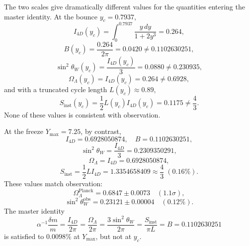 \documentclass[12pt,oneside,openany]{book}
\begin{document}
The two scales give dramatically different values for the quantities entering the master identity. At the bounce $y_c = 0.7937$,
\begin{equation}
I_{4D}(y_c) = \int_0^{0.7937} \frac{y\,dy}{1 + 2y^3} = 0.264,
\label{eq:I4D-yc}
\end{equation}
\begin{equation}
B(y_c) = \frac{0.264}{2\pi} = 0.0420 \neq 0.1102630251,
\label{eq:B-yc}
\end{equation}
\begin{equation}
\sin^2\theta_W(y_c) = \frac{I_{4D}(y_c)}{3} = 0.0880 \neq 0.230935,
\label{eq:sin2-yc}
\end{equation}
\begin{equation}
\Omega_\Lambda(y_c) = I_{4D}(y_c) = 0.264 \neq 0.6928,
\label{eq:OmegaL-yc}
\end{equation}
and with a truncated cycle length $L(y_c) \approx 0.89$,
\begin{equation}
S_{\mathrm{inst}}(y_c) = \frac{1}{2}L(y_c)I_{4D}(y_c) = 0.1175 \neq \frac{4}{3}.
\label{eq:Sinst-yc}
\end{equation}
None of these values is consistent with observation.

At the freeze $Y_{\max} = 7.25$, by contrast,
\begin{equation}
I_{4D} = 0.6928050874, \quad B = 0.1102630251,
\label{eq:I4D-B-Ymax}
\end{equation}
\begin{equation}
\sin^2\theta_W = \frac{I_{4D}}{3} = 0.2309350291,
\label{eq:sin2-Ymax}
\end{equation}
\begin{equation}
\Omega_\Lambda = I_{4D} = 0.6928050874,
\label{eq:OmegaL-Ymax}
\end{equation}
\begin{equation}
S_{\mathrm{inst}} = \frac{1}{2}LI_{4D} = 1.3354658409 \approx \frac{4}{3}\;(0.16\%).
\label{eq:Sinst-Ymax}
\end{equation}
These values match observation:
\begin{equation}
\Omega_\Lambda^{\mathrm{Planck}} = 0.6847 \pm 0.0073 \quad (1.1\sigma),
\label{eq:OmegaL-obs}
\end{equation}
\begin{equation}
\sin^2\theta_W^{\mathrm{obs}} = 0.23121 \pm 0.00004 \quad (0.12\%).
\label{eq:sin2-obs}
\end{equation}
The master identity
\begin{equation}
\boxed{\alpha^{-1}\frac{\delta m}{m} = \frac{I_{4D}}{2\pi} = \frac{\Omega_\Lambda}{2\pi} = \frac{3\sin^2\theta_W}{2\pi} = \frac{S_{\mathrm{inst}}}{\pi L} = B = 0.1102630251}
\label{eq:master-lock}
\end{equation}
is satisfied to $0.0098\%$ at $Y_{\max}$, but not at $y_c$.
\end{document}
